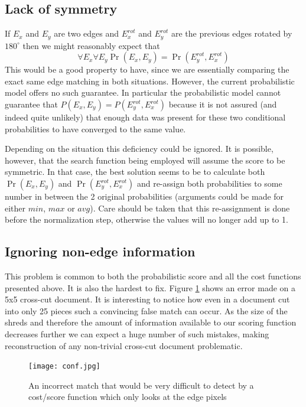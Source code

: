 \subsection{Lack of symmetry}
If \(E_x\) and \(E_y\) are two edges and \(E_x^{rot}\) and \(E_y^{rot}\) are the previous edges rotated by \(180^\circ\) then we might reasonably expect that \[\forall E_x \forall E_y \Pr(E_x,E_y) = \Pr(E_y^{rot},E_x^{rot})\] This would be a good property to have, since we are essentially comparing the exact same edge matching in both situations. However, the current probabilistic model offers no such guarantee. In particular the probabilistic model cannot guarantee that \(P(E_x,E_y) = P(E_y^{rot},E_x^{rot}) \) because it is not assured (and indeed quite unlikely) that enough data was present for these two conditional probabilities to have converged to the same value.

Depending on the situation this deficiency could be ignored. It is possible, however, that the search function being employed will assume the score to be symmetric. In that case, the best solution seems to be to calculate both \(\Pr(E_x,E_y)\) and  \(\Pr(E_y^{rot},E_x^{rot})\) and re-assign both probabilities to some number in between the 2 original probabilities (arguments could be made for either $min$, $max$ or $avg$). Care should be taken that this re-assignment is done before the normalization step, otherwise the values will no longer add up to 1.

\subsection{Ignoring non-edge information}
\label{chap5NE}
This problem is common to both the probabilistic score and all the cost functions presented above. It is also the hardest to fix. Figure \ref{fig:fakeMatch} shows an error made on a 5x5 cross-cut document. It is interesting to notice how even in a document cut into only 25 pieces such a convincing false match can occur. As the size of the shreds and therefore the amount of information available to our scoring function decreases further we can expect a huge number of such mistakes, making reconstruction of any non-trivial cross-cut document problematic.

\begin{figure}[h]
\centering
\texttt{[image: conf.jpg]}
\caption{An incorrect match that would be very difficult to detect by a cost/score function which only looks at the edge pixels}
\label{fig:fakeMatch}
\end{figure}

